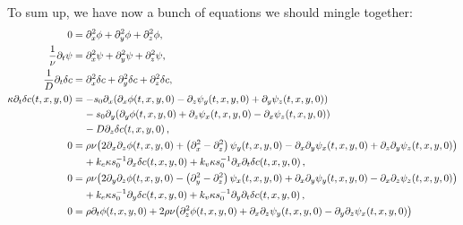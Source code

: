 \documentclass[reqno]{amsart}
\numberwithin{equation}{section}
\numberwithin{figure}{section}
\begin{document}
To sum up, we have now a bunch of equations we should mingle together:
\begin{align}
0
  &= \partial_{x}^{2}\vPotential+\partial_{y}^{2}\vPotential+\partial_{z}^{2}\vPotential, \label{eq:modified-Hansens-model} \\
\frac{1}{\kinematicViscousity}\partial_{t}\vStream
  &= \partial_{x}^{2}\vStream+\partial_{y}^{2}\vStream+\partial_{z}^{2}\vStream, \nonumber \\
\frac{1}{D}\partial_{t}\delta\sBulkCo
  &= \partial_{x}^{2}\delta\sBulkCo+\partial_{y}^{2}\delta\sBulkCo+\partial_{z}^{2}\delta\sBulkCo, \nonumber \\
\kappa\partial_{t}\delta\sBulkCo\!\left(t,x,y,0\right)
  &= -\sSurfCo_{0}\partial_{x}\!\left(\partial_{x}\vPotential\!\left(t,x,y,0\right)-\partial_{z}\vStream_{y}\!\left(t,x,y,0\right)+\partial_{y}\vStream_{z}\!\left(t,x,y,0\right)\right) \nonumber \\
  &\phantom{=}\,\,-\sSurfCo_{0}\partial_{y}\!\left(\partial_{y}\vPotential\!\left(t,x,y,0\right)+\partial_{z}\vStream_{x}\!\left(t,x,y,0\right)-\partial_{x}\vStream_{z}\!\left(t,x,y,0\right)\right) \nonumber \\
  &\phantom{=}\,\,-D\partial_{z}\delta\sBulkCo\!\left(t,x,y,0\right), \nonumber \\
0
  &= \sDensity\kinematicViscousity\!\left(2\partial_{x}\partial_{z}\vPotential\!\left(t,x,y,0\right)+\left(\partial_{x}^{2}-\partial_{z}^{2}\right)\vStream_{y}\!\left(t,x,y,0\right)-\partial_{x}\partial_{y}\vStream_{x}\!\left(t,x,y,0\right)+\partial_{z}\partial_{y}\vStream_{z}\!\left(t,x,y,0\right)\right) \nonumber \\
  &\phantom{=}\,\,+k_{e}\kappa\sSurfCo_{0}^{-1}\partial_{x}\delta\sBulkCo\!\left(t,x,y,0\right)+k_{v}\kappa\sSurfCo_{0}^{-1}\partial_{x}\partial_{t}\delta\sBulkCo\!\left(t,x,y,0\right), \nonumber \\
0
  &= \sDensity\kinematicViscousity\!\left(2\partial_{y}\partial_{z}\vPotential\!\left(t,x,y,0\right)-\left(\partial_{y}^{2}-\partial_{z}^{2}\right)\vStream_{x}\!\left(t,x,y,0\right)+\partial_{x}\partial_{y}\vStream_{y}\!\left(t,x,y,0\right)-\partial_{x}\partial_{z}\vStream_{z}\!\left(t,x,y,0\right)\right) \nonumber \\
  &\phantom{=}\,\,+k_{e}\kappa\sSurfCo_{0}^{-1}\partial_{y}\delta\sBulkCo\!\left(t,x,y,0\right)+k_{v}\kappa\sSurfCo_{0}^{-1}\partial_{y}\partial_{t}\delta\sBulkCo\!\left(t,x,y,0\right), \nonumber \\
0
  &= \sDensity\partial_{t}\vPotential\!\left(t,x,y,0\right)+2\sDensity\kinematicViscousity\!\left(\partial_{z}^{2}\vPotential\!\left(t,x,y,0\right)+\partial_{x}\partial_{z}\vStream_{y}\!\left(t,x,y,0\right)-\partial_{y}\partial_{z}\vStream_{x}\!\left(t,x,y,0\right)\right) \nonumber \\

\end{align}
\end{document}
